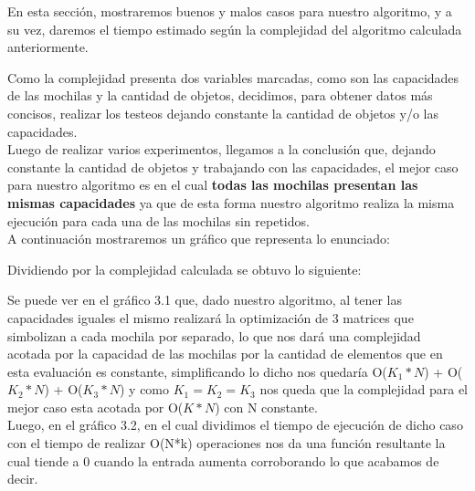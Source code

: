 \indent En esta secci\'on, mostraremos buenos y malos casos para nuestro algoritmo, y a su vez, daremos el tiempo estimado 
seg\'un la complejidad del algoritmo calculada anteriormente.

Como la complejidad presenta dos variables marcadas, como son las capacidades de las mochilas y la cantidad de objetos, decidimos, para obtener datos m\'as concisos, realizar los testeos dejando constante la cantidad de objetos y/o las capacidades.\\

Luego de realizar varios experimentos, llegamos a la conclusi\'on que, dejando constante la cantidad de objetos y trabajando con las capacidades, el mejor caso para nuestro algoritmo es en el cual \textbf{todas las mochilas presentan las mismas capacidades} ya que de esta forma nuestro algoritmo realiza la misma ejecuci\'on para cada una de las mochilas sin repetidos.\\
A continuaci\'on mostraremos un gr\'afico que representa lo enunciado:

\vspace*{0.3cm} \vspace*{0.3cm}
  \begin{center}
  \end{center}
  \vspace*{0.3cm}

Dividiendo por la complejidad calculada se obtuvo lo siguiente:\\

\vspace*{0.3cm} \vspace*{0.3cm}
  \begin{center}
  \end{center}
  \vspace*{0.3cm}
  
Se puede ver en el gr\'afico 3.1 que, dado nuestro algoritmo, al tener las capacidades iguales el mismo realizar\'a la optimizaci\'on de 3 matrices que simbolizan a cada mochila por separado, lo que nos dar\'a una complejidad acotada por la capacidad de las mochilas por la cantidad de elementos que en esta evaluaci\'on es constante, simplificando lo dicho nos quedar\'ia O($K_{1}\ast N$) + O($K_{2}\ast N$) + O($K_{3}\ast N$) y como $K_{1} = K_{2} = K_{3}$ nos queda que la complejidad para el mejor caso esta acotada por O($K \ast N$) con N constante.\\
Luego, en el gr\'afico 3.2, en el cual dividimos el tiempo de ejecuci\'on de dicho caso con el tiempo de realizar O(N*k) operaciones nos da una funci\'on resultante la cual tiende a 0 cuando la entrada aumenta corroborando lo que acabamos de decir.\\


